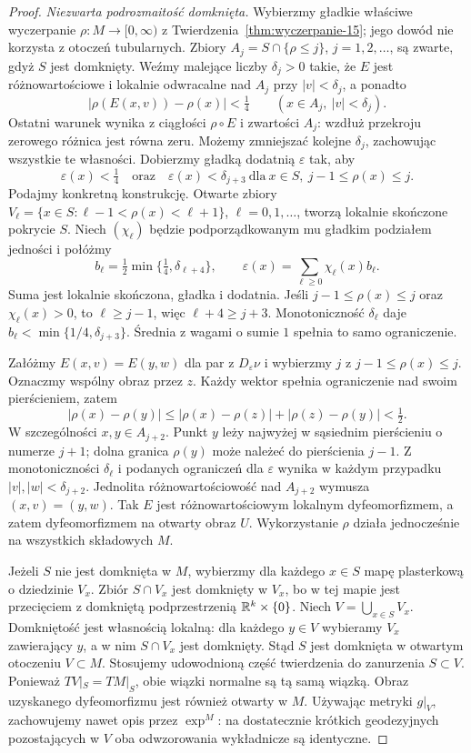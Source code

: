 \begin{proof}
\emph{Niezwarta podrozmaitość domknięta.}
Wybierzmy gładkie właściwe wyczerpanie
$\rho:M\to[0,\infty)$ z
Twierdzenia~\ref{thm:wyczerpanie-15}; jego dowód
nie korzysta z otoczeń tubularnych.
Zbiory $A_j=S\cap\{\rho\leq j\}$, $j=1,2,\ldots$,
są zwarte, gdyż $S$ jest domknięty.
Weźmy malejące liczby $\delta_j>0$
takie, że $E$ jest różnowartościowe
i lokalnie odwracalne nad $A_j$
przy $|v|<\delta_j$, a ponadto
\[
 |\rho(E(x,v))-\rho(x)|<\tfrac14
 \qquad(x\in A_j,\ |v|<\delta_j).
\]
Ostatni warunek wynika z ciągłości $\rho\circ E$
i zwartości $A_j$: wzdłuż przekroju zerowego
różnica jest równa zeru. Możemy zmniejszać kolejne
$\delta_j$, zachowując wszystkie te własności.
Dobierzmy gładką
dodatnią $\varepsilon$ tak, aby
\[
  \varepsilon(x)<\tfrac14
  \quad\text{oraz}\quad
  \varepsilon(x)<\delta_{j+3}
  \ \text{dla}\ x\in S,\
       j-1\leq\rho(x)\leq j.
\]
Podajmy konkretną konstrukcję.
Otwarte zbiory $V_\ell=\{x\in S:\ell-1<\rho(x)<\ell+1\}$,
$\ell=0,1,\ldots$, tworzą lokalnie skończone pokrycie $S$.
Niech $(\chi_\ell)$ będzie podporządkowanym mu gładkim
podziałem jedności i połóżmy
\[
 b_\ell=\tfrac12\min\{\tfrac14,\delta_{\ell+4}\},
 \qquad
 \varepsilon(x)=\sum_{\ell\geq0}\chi_\ell(x)b_\ell.
\]
Suma jest lokalnie skończona, gładka i dodatnia.
Jeśli $j-1\leq\rho(x)\leq j$ oraz $\chi_\ell(x)>0$,
to $\ell\geq j-1$, więc $\ell+4\geq j+3$.
Monotoniczność $\delta_\ell$ daje
$b_\ell<\min\{1/4,\delta_{j+3}\}$.
Średnia z wagami o sumie $1$ spełnia to samo ograniczenie.

Załóżmy $E(x,v)=E(y,w)$ dla par
z $D_\varepsilon\nu$ i wybierzmy $j$
z $j-1\leq\rho(x)\leq j$.
Oznaczmy wspólny obraz przez $z$. Każdy wektor
spełnia ograniczenie nad swoim pierścieniem, zatem
\[
 |\rho(x)-\rho(y)|
 \leq |\rho(x)-\rho(z)|+|\rho(z)-\rho(y)|<\tfrac12.
\]
W szczególności $x,y\in A_{j+2}$.
Punkt $y$ leży najwyżej w sąsiednim
pierścieniu o numerze $j+1$; dolna
granica $\rho(y)$ może należeć
do pierścienia $j-1$. Z monotoniczności
$\delta_\ell$ i podanych ograniczeń
dla $\varepsilon$ wynika w każdym
przypadku $|v|,|w|<\delta_{j+2}$.
Jednolita różnowartościowość nad
$A_{j+2}$ wymusza $(x,v)=(y,w)$.
Tak $E$ jest różnowartościowym
lokalnym dyfeomorfizmem, a zatem
dyfeomorfizmem na otwarty obraz $U$.
Wykorzystanie $\rho$ działa
jednocześnie na wszystkich
składowych $M$.

Jeżeli $S$ nie jest domknięta w $M$,
wybierzmy dla każdego $x\in S$
mapę plasterkową o dziedzinie $V_x$.
Zbiór $S\cap V_x$ jest domknięty
w $V_x$, bo w tej mapie jest
przecięciem z domkniętą
podprzestrzenią $\mathbb{R}^k\times\{0\}$.
Niech $V=\bigcup_{x\in S}V_x$.
Domkniętość jest własnością
lokalną: dla każdego $y\in V$
wybieramy $V_x$ zawierający $y$,
a w nim $S\cap V_x$ jest domknięty.
Stąd $S$ jest domknięta w otwartym
otoczeniu $V\subset M$.
Stosujemy udowodnioną część
twierdzenia do zanurzenia $S\subset V$.
Ponieważ $TV|_S=TM|_S$, obie
wiązki normalne są tą samą wiązką.
Obraz uzyskanego dyfeomorfizmu
jest również otwarty w $M$. Używając metryki $g|_V$,
zachowujemy nawet opis przez $\exp^M$: na dostatecznie
krótkich geodezyjnych pozostających w $V$ oba odwzorowania
wykładnicze są identyczne.
\end{proof}

